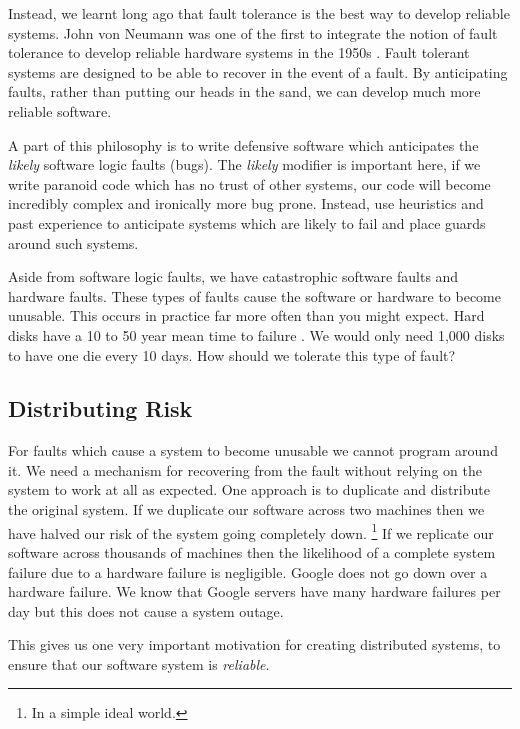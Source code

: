 Instead, we learnt long ago that fault tolerance is the best way to develop reliable systems.
John von Neumann was one of the first to integrate the notion of fault tolerance to develop reliable hardware systems in the 1950s \cite{neumann-faults}.
Fault tolerant systems are designed to be able to recover in the event of a fault.
By anticipating faults, rather than putting our heads in the sand,
we can develop much more reliable software.

A part of this philosophy is to write defensive software which anticipates the \textsl{likely} software logic faults (bugs).
The \textsl{likely} modifier is important here,
if we write paranoid code which has no trust of other systems,
our code will become incredibly complex and ironically more bug prone.
Instead, use heuristics and past experience to anticipate systems which are likely to fail and place guards around such systems.

Aside from software logic faults,
we have catastrophic software faults and hardware faults.
These types of faults cause the software or hardware to become unusable.
This occurs in practice far more often than you might expect.
Hard disks have a 10 to 50 year mean time to failure \cite{data-intensive}.
We would only need 1,000 disks to have one die every 10 days.
How should we tolerate this type of fault?

\subsection{Distributing Risk}
For faults which cause a system to become unusable we cannot program around it.
We need a mechanism for recovering from the fault without relying on the system to work at all as expected.
One approach is to duplicate and distribute the original system.
If we duplicate our software across two machines then we have halved our risk of the system going completely down.%
\footnote{In a simple ideal world.}
If we replicate our software across thousands of machines then the likelihood of a complete system failure due to a hardware failure is negligible.
Google does not go down over a hardware failure.
We know that Google servers have many hardware failures per day but this does not cause a system outage.

This gives us one very important motivation for creating distributed systems,
to ensure that our software system is \textit{reliable}.


